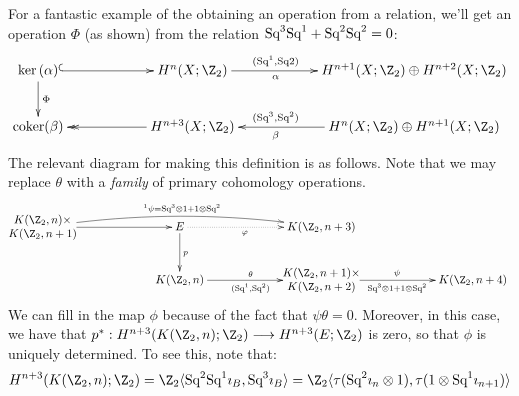 \documentclass[11pt]{article}
\begin{document}
For a fantastic example of the obtaining an operation from a relation, we'll get
an operation $\Phi$ (as shown) from the relation $\textup{Sq}^3\textup{Sq}^1+\textup{Sq}^2\textup{Sq}^2=0$:
\[\label{31is22}\xymatrix@C=2cm{
\ker(\alpha)\ar@{^{(}->}[r]\ar[d]^\Phi&
H^n(X;\Z_2)\ar[r]_{\alpha\qquad\qquad}^{(\Squ^1,\Squ2)\qquad\qquad}&
H^{n+1}(X;\Z_2)\oplus H^{n+2}(X;\Z_2)\\
\coker(\beta)&H^{n+3}(X;\Z_2)\ar@{->>}[l]&
\ar[l]_{(\Squ^3,\Squ^2)\qquad\qquad}^{\beta\qquad\qquad}
H^{n}(X;\Z_2)\oplus H^{n+1}(X;\Z_2)
}\]
The relevant diagram for making this definition is as follows. Note that we may
replace $\theta$ with a \emph{family} of primary cohomology operations.
\[\xymatrix@C=2.3cm{
*\txt{$K(\Z_2,n)\times$\\$K(\Z_2,n+1)$}\ar[r]
\ar@/^.8pc/[rr]^{^1\psi=\Squ^3\otimes1+1\otimes\Squ^2}&
E\ar@{.>}[r]_{\phi\ \ \ }\ar[d]^p&K(\Z_2,n+3)\\
&
K(\Z_2,n)\ar[r]^\theta_{(\Squ^1,\Squ^2)}&
*\txt{$K(\Z_2,n+1)\times$\\$K(\Z_2,n+2)$}
\ar[r]^\psi_{\Squ^3\otimes1+1\otimes\Squ^2}&
K(\Z_2,n+4)
}\]
We can fill in the map $\phi$ because of the fact that $\psi\theta=0$. Moreover,
in this case, we have that $p^*:H^{n+3}(K(\Z_2,n);\Z_2)\to H^{n+3}(E;\Z_2)$ is
zero, so that $\phi$ is uniquely determined. To see this, note that:
\[H^{n+3}(K(\Z_2,n);\Z_2)=\Z_2\langle\Squ^2\Squ^1\imath_B,\Squ^3\imath_B\rangle
=\Z_2\langle\tau(\Squ^2\imath_{n}\otimes1),
\tau(1\otimes\Squ^1\imath_{n+1})\rangle
\]
\end{document}
